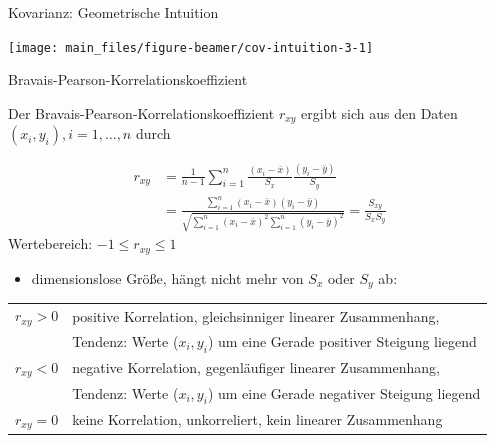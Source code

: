 \documentclass[
  10pt,
  ignorenonframetext,
]{beamer}
\providecommand{\tightlist}{%
  \setlength{\itemsep}{0pt}\setlength{\parskip}{0pt}}
\begin{document}
\begin{frame}{Kovarianz: Geometrische Intuition}
\label{kovarianz-geometrische-intuition-2}
\scriptsize

\begin{center}\texttt{[image: main\_files/figure-beamer/cov-intuition-3-1]} \end{center}

\normalsize

\end{frame}

\begin{frame}{Bravais-Pearson-Korrelationskoeffizient}
\label{bravais-pearson-korrelationskoeffizient}
\small

Der Bravais-Pearson-Korrelationskoeffizient \(r_{xy}\) ergibt sich aus
den Daten \((x_i,y_i), i=1,\ldots,n\) durch

\vspace{0.3cm}

\begin{align*}
      r_{xy} &= \frac{1}{n-1} \sum_{i=1}^n \frac{(x_i - \bar x)}{S_x}\frac{(y_i - \bar y)}{S_y} \\
             &= \frac{\sum_{i=1}^n(x_i - \bar x)(y_i - \bar y)}
      {\sqrt{\sum_{i=1}^n(x_i - \bar x)^2 \sum_{i=1}^n(y_i - \bar y)^2}} = \frac{S_{xy}}{S_x S_y}
  \end{align*} Wertebereich: \(-1 \leq r_{xy} \leq 1\)

\begin{itemize}
\tightlist
\item
  dimensionslose Größe, hängt nicht mehr von \(S_x\) oder \(S_y\) ab:
\end{itemize}

\vspace{0.3cm}

\begin{tabular}{ll}
  $r_{xy}>0$ & positive Korrelation, gleichsinniger linearer Zusammenhang, \\
  &Tendenz: Werte ($x_i,y_i$) um eine Gerade positiver Steigung liegend\\
  $r_{xy}<0$ & negative Korrelation, gegenläufiger linearer Zusammenhang, \\
  &Tendenz: Werte ($x_i,y_i$) um eine Gerade negativer Steigung liegend\\
  $r_{xy}=0$ & keine Korrelation, unkorreliert, kein linearer Zusammenhang
\end{tabular}
\end{frame}
\end{document}
